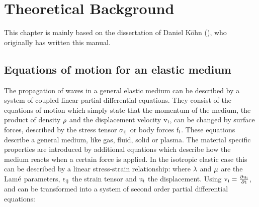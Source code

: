 
\chapter{Theoretical Background}

This chapter is mainly based on the dissertation of Daniel Köhn (\cite{koehn:11}), who originally has written this manual.
\section{Equations of motion for an elastic medium}\label{elastic_fd_model} 
The propagation of waves in a general elastic medium can be described by a system of coupled linear partial differential equations. They consist of the equations of motion
which simply state that the momentum of the medium, the product of density $\rm{\rho}$ and the displacement velocity $\rm{v_i}$, can be changed by surface forces, described by the stress tensor $\rm{\sigma_{ij}}$ or body forces $\rm{f_i}$. These equations describe a general medium, like gas, fluid, solid or plasma. The material specific properties are introduced by additional equations which describe how the medium reacts when a certain force is applied. In the isotropic elastic case this can be described by a linear stress-strain relationship:  
where $\rm{\lambda}$ and $\rm{\mu}$ are the Lam$\rm{\acute{e}}$ parameters, $\rm{\epsilon_{ij}}$ the strain tensor and $\rm{u_i}$ the displacement. Using $\rm{v_i = \frac{\partial u_i}{\partial t}}$,  and  can be transformed into a system of second order partial differential equations:
